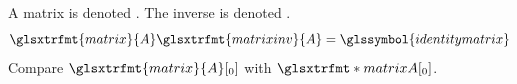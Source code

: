 \documentclass[12pt]{article}
\begin{document}
A \gls{matrix} is denoted .
The inverse is denoted .
\[
\glsxtrfmt{matrix}{A}
\glsxtrfmt{matrixinv}{A}
=
\glssymbol{identitymatrix}
\]
Compare $\glsxtrfmt{matrix}{A}[_0]$
with $\glsxtrfmt*{matrix}{A}[_0]$. \printglossaries 
\end{document}
